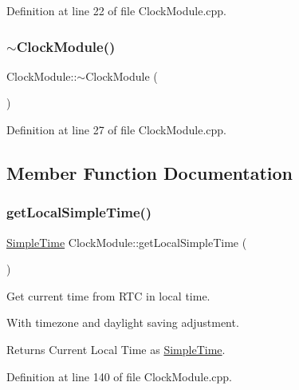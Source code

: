 Definition at line 22 of file Clock\+Module.\+cpp.

\mbox{\label{class_clock_module_a7e2e3fc944235bc3d779150fb2ea5063}} 
\subsubsection{\texorpdfstring{$\sim$ClockModule()}{~ClockModule()}}
{\footnotesize\ttfamily Clock\+Module\+::$\sim$\+Clock\+Module (\begin{DoxyParamCaption}{ }\end{DoxyParamCaption})}



Definition at line 27 of file Clock\+Module.\+cpp.



\subsection{Member Function Documentation}
\mbox{\label{class_clock_module_aa208cd29a002d60e4e5f064813acf9f3}} 
\subsubsection{\texorpdfstring{getLocalSimpleTime()}{getLocalSimpleTime()}}
{\footnotesize\ttfamily \mbox{\hyperlink{class_simple_time}{Simple\+Time}} Clock\+Module\+::get\+Local\+Simple\+Time (\begin{DoxyParamCaption}{ }\end{DoxyParamCaption})}



Get current time from R\+TC in local time. 

With timezone and daylight saving adjustment. \begin{DoxyReturn}{Returns}
Current Local Time as \mbox{\hyperlink{class_simple_time}{Simple\+Time}}. 
\end{DoxyReturn}


Definition at line 140 of file Clock\+Module.\+cpp.

\mbox{\label{class_clock_module_a4e1dc771d7467c2bd5e9c7885231982e}} 
